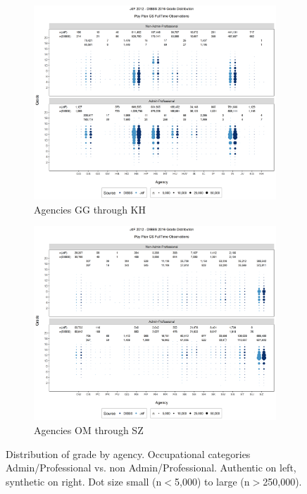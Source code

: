 \documentclass[10pt, letterpaper]{article}
\begin{document}
\begin{spacing}{1.0}
\begin{figure}[]
    \centering
    \begin{subfigure}{1\textwidth}
        \centering
        \includegraphics[width=6in, trim={0 0.55in 0 0.75in}, clip]{JdFDIBBSGSFullTimeGradeAdminProfessionalAgency61.png}
        \caption{Agencies GG through KH}
        \vspace{10pt}
    \end{subfigure}
    \begin{subfigure}{1\textwidth}
        \centering
        \includegraphics[width=6in, trim={0 0.55in 0 0.75in}, clip]{JdFDIBBSGSFullTimeGradeAdminProfessionalAgency101.png}
        \caption{Agencies OM through SZ}
    \end{subfigure}
    \caption{Distribution of grade by agency.  Occupational categories Admin/Professional vs. non Admin/Professional.  Authentic on left, synthetic on right.  Dot size small (n$<$5,000) to large (n$>$250,000).}
    \label{figure:JdFDIBBSGSFullTimeGradeAdminProfessionalAgency}
\end{figure}


\end{spacing}
\end{document}
